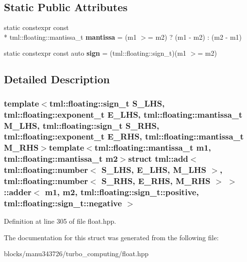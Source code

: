 \subsection*{Static Public Attributes}
\begin{DoxyCompactItemize}
\item 
\hypertarget{structtml_1_1add_3_01tml_1_1floating_1_1number_3_01_s___l_h_s_00_01_e___l_h_s_00_01_m___l_h_s_012f891e05bc1eb57b4be51c977e00b324_af0c5b89c86df034447a83acdf13b44c5}{static constexpr const \\*
tml\+::floating\+::mantissa\+\_\+t {\bfseries mantissa} = (m1 $>$= m2) ? (m1 -\/ m2) \+: (m2 -\/ m1)}\label{structtml_1_1add_3_01tml_1_1floating_1_1number_3_01_s___l_h_s_00_01_e___l_h_s_00_01_m___l_h_s_012f891e05bc1eb57b4be51c977e00b324_af0c5b89c86df034447a83acdf13b44c5}

\item 
\hypertarget{structtml_1_1add_3_01tml_1_1floating_1_1number_3_01_s___l_h_s_00_01_e___l_h_s_00_01_m___l_h_s_012f891e05bc1eb57b4be51c977e00b324_a3cc2552ef39efb7c67706073f2495558}{static constexpr const auto {\bfseries sign} = (tml\+::floating\+::sign\+\_\+t)(m1 $>$= m2)}\label{structtml_1_1add_3_01tml_1_1floating_1_1number_3_01_s___l_h_s_00_01_e___l_h_s_00_01_m___l_h_s_012f891e05bc1eb57b4be51c977e00b324_a3cc2552ef39efb7c67706073f2495558}

\end{DoxyCompactItemize}


\subsection{Detailed Description}
\subsubsection*{template$<$tml\+::floating\+::sign\+\_\+t S\+\_\+\+L\+H\+S, tml\+::floating\+::exponent\+\_\+t E\+\_\+\+L\+H\+S, tml\+::floating\+::mantissa\+\_\+t M\+\_\+\+L\+H\+S, tml\+::floating\+::sign\+\_\+t S\+\_\+\+R\+H\+S, tml\+::floating\+::exponent\+\_\+t E\+\_\+\+R\+H\+S, tml\+::floating\+::mantissa\+\_\+t M\+\_\+\+R\+H\+S$>$template$<$tml\+::floating\+::mantissa\+\_\+t m1, tml\+::floating\+::mantissa\+\_\+t m2$>$struct tml\+::add$<$ tml\+::floating\+::number$<$ S\+\_\+\+L\+H\+S, E\+\_\+\+L\+H\+S, M\+\_\+\+L\+H\+S $>$, tml\+::floating\+::number$<$ S\+\_\+\+R\+H\+S, E\+\_\+\+R\+H\+S, M\+\_\+\+R\+H\+S $>$ $>$\+::adder$<$ m1, m2, tml\+::floating\+::sign\+\_\+t\+::positive, tml\+::floating\+::sign\+\_\+t\+::negative $>$}



Definition at line 305 of file float.\+hpp.



The documentation for this struct was generated from the following file\+:\begin{DoxyCompactItemize}
\item 
blocks/manu343726/turbo\+\_\+computing/float.\+hpp\end{DoxyCompactItemize}
